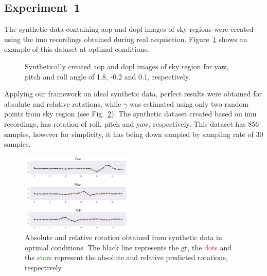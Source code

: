 \subsection{Experiment~1}
\label{sec:exp1}
The synthetic data containing \gls{aop} and \gls{dopl} images of sky regions
were created using the \gls{imu} recordings obtained during real acquisition.
Figure~\ref{fig:aop-dop-syn} shows an example of this dataset at
optimal conditions.
\begin{figure}
    \centering
    \hfill
    \label{fig:aop-syn}
    \label{fig:dop-syn}
    \hspace*{\fill}
    \caption{Synthetically created \gls{aop} and \gls{dopl} images of sky
      region for yaw, pitch and roll angle of 1.8, -0.2 and 0.1, respectively.}
    \label{fig:aop-dop-syn}
\end{figure}

Applying our framework on ideal synthetic data, perfect results were obtained
for absolute and relative rotations, while $\gamma$ was estimated using only
two random points from sky region (see Fig.~\ref{fig:res-syn-ideal-abs-rel}).
The synthetic dataset created based on \gls{imu} recordings, has rotation of
roll, pitch and yaw, respectively. This dataset has 856 samples, however for
simplicity, it has being down sampled by sampling rate of 30 samples.

\begin{figure}
  \includegraphics[width=0.47\textwidth]{./content/experiments/figures/ideal-syn-abs-rel-2.jpg}
  \caption{Absolute and relative rotation obtained from synthetic data in
    optimal conditions. The black line represents the \gls{gt}, the
    \textcolor{red}{dots} and the \textcolor{green}{stars} represent the
    absolute and relative predicted rotations, respectively.}
  \label{fig:res-syn-ideal-abs-rel}
\end{figure}

